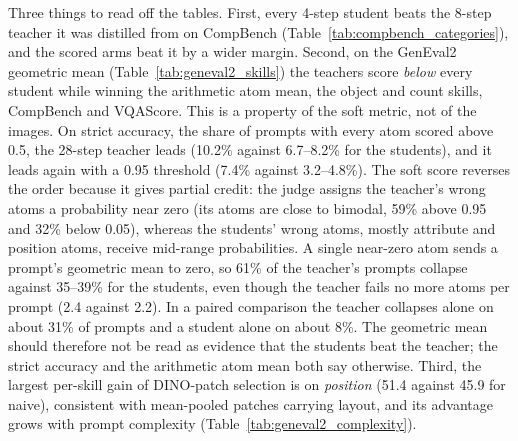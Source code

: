 \documentclass[11pt,a4paper]{article}
\begin{document}
Three things to read off the tables. First, every 4-step student beats the 8-step teacher it was distilled from on CompBench (Table~\ref{tab:compbench_categories}), and the scored arms beat it by a wider margin. Second, on the GenEval2 geometric mean (Table~\ref{tab:geneval2_skills}) the teachers score \emph{below} every student while winning the arithmetic atom mean, the object and count skills, CompBench and VQAScore. This is a property of the soft metric, not of the images. On strict accuracy, the share of prompts with every atom scored above 0.5, the 28-step teacher leads (10.2\% against 6.7--8.2\% for the students), and it leads again with a 0.95 threshold (7.4\% against 3.2--4.8\%). The soft score reverses the order because it gives partial credit: the judge assigns the teacher's wrong atoms a probability near zero (its atoms are close to bimodal, 59\% above 0.95 and 32\% below 0.05), whereas the students' wrong atoms, mostly attribute and position atoms, receive mid-range probabilities. A single near-zero atom sends a prompt's geometric mean to zero, so 61\% of the teacher's prompts collapse against 35--39\% for the students, even though the teacher fails no more atoms per prompt (2.4 against 2.2). In a paired comparison the teacher collapses alone on about 31\% of prompts and a student alone on about 8\%. The geometric mean should therefore not be read as evidence that the students beat the teacher; the strict accuracy and the arithmetic atom mean both say otherwise. Third, the largest per-skill gain of DINO-patch selection is on \emph{position} (51.4 against 45.9 for naive), consistent with mean-pooled patches carrying layout, and its advantage grows with prompt complexity (Table~\ref{tab:geneval2_complexity}).
\end{document}
